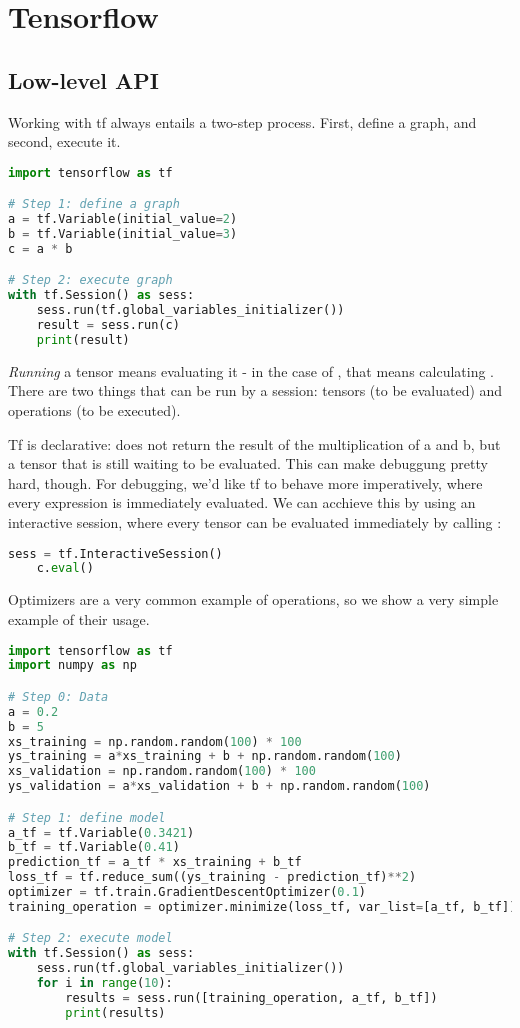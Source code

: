 \section{Tensorflow}

\subsection{Low-level API}

Working with tf always entails a two-step process. First, define a graph, and second, execute it. 

\begin{lstlisting}[language=python]
import tensorflow as tf

# Step 1: define a graph
a = tf.Variable(initial_value=2)
b = tf.Variable(initial_value=3)
c = a * b

# Step 2: execute graph
with tf.Session() as sess:
    sess.run(tf.global_variables_initializer())
    result = sess.run(c)
    print(result)

\end{lstlisting}

\emph{Running} a tensor means evaluating it - in the case of , that means calculating .
There are two things that can be run by a session: tensors (to be evaluated) and operations (to be executed). 

Tf is declarative:  does not return the result of the multiplication of a and b, but a tensor that is still waiting to be evaluated. 
This can make debuggung pretty hard, though. For debugging, we'd like tf to behave more imperatively, where every expression is immediately evaluated. 
We can acchieve this by using an interactive session, where every tensor can be evaluated immediately by calling :
\begin{lstlisting}[language=python]
    sess = tf.InteractiveSession()
    c.eval()
\end{lstlisting}

Optimizers are a very common example of operations, so we show a very simple example of their usage.

\begin{lstlisting}[language=python]
import tensorflow as tf
import numpy as np

# Step 0: Data
a = 0.2
b = 5
xs_training = np.random.random(100) * 100
ys_training = a*xs_training + b + np.random.random(100)
xs_validation = np.random.random(100) * 100
ys_validation = a*xs_validation + b + np.random.random(100)

# Step 1: define model
a_tf = tf.Variable(0.3421)
b_tf = tf.Variable(0.41)
prediction_tf = a_tf * xs_training + b_tf
loss_tf = tf.reduce_sum((ys_training - prediction_tf)**2)
optimizer = tf.train.GradientDescentOptimizer(0.1)
training_operation = optimizer.minimize(loss_tf, var_list=[a_tf, b_tf])

# Step 2: execute model
with tf.Session() as sess:
    sess.run(tf.global_variables_initializer())
    for i in range(10):
        results = sess.run([training_operation, a_tf, b_tf])
        print(results)


\end{lstlisting}